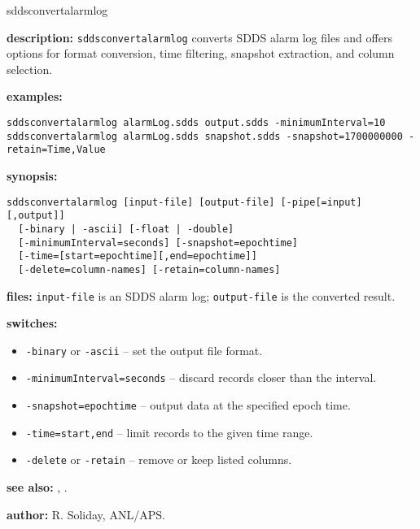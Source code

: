 \begin{sddsprog}{sddsconvertalarmlog}
  \item \textbf{description:} \verb|sddsconvertalarmlog| converts SDDS alarm log files and offers options for format conversion, time filtering, snapshot extraction, and column selection.
  \item \textbf{examples:}
    \begin{verbatim}
sddsconvertalarmlog alarmLog.sdds output.sdds -minimumInterval=10
sddsconvertalarmlog alarmLog.sdds snapshot.sdds -snapshot=1700000000 -retain=Time,Value
    \end{verbatim}
  \item \textbf{synopsis:}
    \begin{verbatim}
sddsconvertalarmlog [input-file] [output-file] [-pipe[=input][,output]]
  [-binary | -ascii] [-float | -double]
  [-minimumInterval=seconds] [-snapshot=epochtime]
  [-time=[start=epochtime][,end=epochtime]]
  [-delete=column-names] [-retain=column-names]
    \end{verbatim}
  \item \textbf{files:} \verb|input-file| is an SDDS alarm log; \verb|output-file| is the converted result.
  \item \textbf{switches:}
    \begin{itemize}
      \item \verb|-binary| or \verb|-ascii| -- set the output file format.
      \item \verb|-minimumInterval=seconds| -- discard records closer than the interval.
      \item \verb|-snapshot=epochtime| -- output data at the specified epoch time.
      \item \verb|-time=start,end| -- limit records to the given time range.
      \item \verb|-delete| or \verb|-retain| -- remove or keep listed columns.
    \end{itemize}
  \item \textbf{see also:} , .
  \item \textbf{author:} R. Soliday, ANL/APS.
\end{sddsprog}

